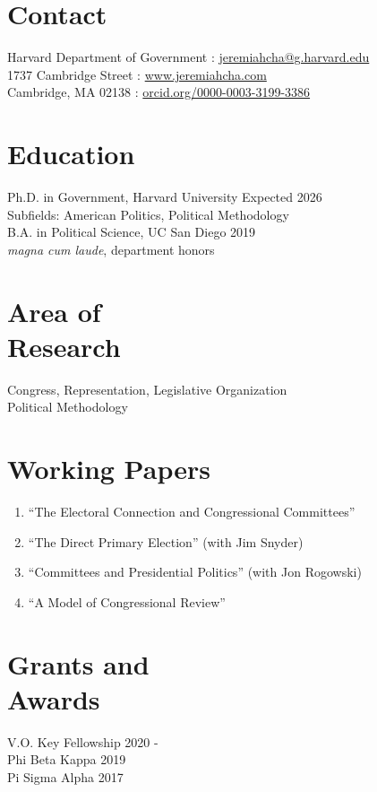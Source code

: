 \documentclass[margin, line]{res}
\begin{document}
\begin{resume}

\section{Contact}
Harvard Department of Government \hfill \Letter: \href{mailto:jeremiahcha@g.harvard.edu}{jeremiahcha@g.harvard.edu}\\
1737 Cambridge Street \hfill \Mundus: \href{httsp://www.jeremiahcha.com}{www.jeremiahcha.com}\\
Cambridge, MA 02138 \hfill \Mundus: \href{https://orcid.org/0000-0003-3199-3386}{orcid.org/0000-0003-3199-3386}

\section{Education}
Ph.D. in Government, Harvard University \hfill Expected 2026\\
\hspace*{5mm}Subfields: American Politics, Political Methodology \\
B.A. in Political Science, UC San Diego \hfill 2019\\
\hspace*{5mm}\textit{magna cum laude}, department honors

\section{Area of \\Research}
Congress, Representation, Legislative Organization\\
Political Methodology

\section{Working Papers}
\begin{enumerate}
	\item ``The Electoral Connection and Congressional Committees''
	\item ``The Direct Primary Election'' (with Jim Snyder)
	\item ``Committees and Presidential Politics'' (with Jon Rogowski)
	\item ``A Model of Congressional Review''
\end{enumerate}

\section{Grants and \\Awards}
V.O. Key Fellowship \hfill 2020 - \\
Phi Beta Kappa \hfill 2019\\
Pi Sigma Alpha \hfill 2017


\end{resume}
\end{document}
